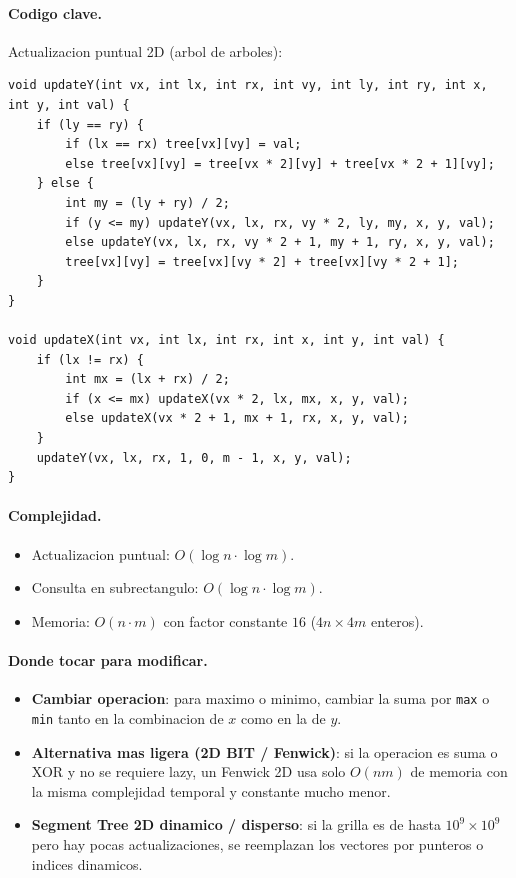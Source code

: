 \paragraph{Codigo clave.}
Actualizacion puntual 2D (arbol de arboles):
\begin{verbatim}
void updateY(int vx, int lx, int rx, int vy, int ly, int ry, int x, int y, int val) {
    if (ly == ry) {
        if (lx == rx) tree[vx][vy] = val;
        else tree[vx][vy] = tree[vx * 2][vy] + tree[vx * 2 + 1][vy];
    } else {
        int my = (ly + ry) / 2;
        if (y <= my) updateY(vx, lx, rx, vy * 2, ly, my, x, y, val);
        else updateY(vx, lx, rx, vy * 2 + 1, my + 1, ry, x, y, val);
        tree[vx][vy] = tree[vx][vy * 2] + tree[vx][vy * 2 + 1];
    }
}

void updateX(int vx, int lx, int rx, int x, int y, int val) {
    if (lx != rx) {
        int mx = (lx + rx) / 2;
        if (x <= mx) updateX(vx * 2, lx, mx, x, y, val);
        else updateX(vx * 2 + 1, mx + 1, rx, x, y, val);
    }
    updateY(vx, lx, rx, 1, 0, m - 1, x, y, val);
}
\end{verbatim}

\paragraph{Complejidad.}
\begin{itemize}\setlength\itemsep{0pt}
	\item Actualizacion puntual: $O(\log n \cdot \log m)$.
	\item Consulta en subrectangulo: $O(\log n \cdot \log m)$.
	\item Memoria: $O(n \cdot m)$ con factor constante $16$ ($4n \times 4m$ enteros).
\end{itemize}

\paragraph{Donde tocar para modificar.}
\begin{itemize}\setlength\itemsep{0pt}
	\item \textbf{Cambiar operacion}: para maximo o minimo, cambiar la suma por \texttt{max} o \texttt{min} tanto en la combinacion de $x$ como en la de $y$.
	\item \textbf{Alternativa mas ligera (2D BIT / Fenwick)}: si la operacion es suma o XOR y no se requiere lazy, un Fenwick 2D usa solo $O(nm)$ de memoria con la misma complejidad temporal y constante mucho menor.
	\item \textbf{Segment Tree 2D dinamico / disperso}: si la grilla es de hasta $10^9 \times 10^9$ pero hay pocas actualizaciones, se reemplazan los vectores por punteros o indices dinamicos.
\end{itemize}

